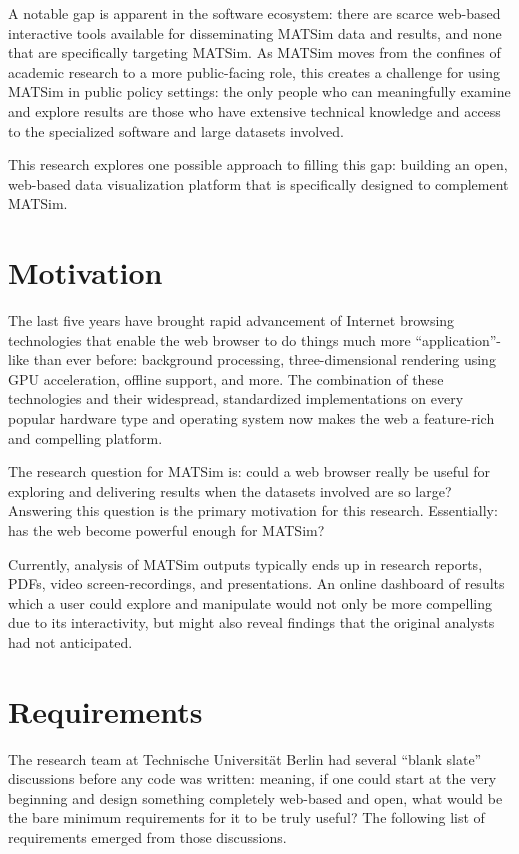 A notable gap is apparent in the software ecosystem: there are scarce web-based interactive tools available for disseminating MATSim data and results, and none that are specifically targeting MATSim. As MATSim moves from the confines of academic research to a more public-facing role, this creates a challenge for using MATSim in public policy settings: the only people who can meaningfully examine and explore results are those who have extensive technical knowledge and access to the specialized software and large datasets involved.

This research explores one possible approach to filling this gap: building an open, web-based data visualization platform that is specifically designed to complement MATSim.

\hypertarget{mathub-motivation}{%
\section{Motivation}\label{mathub-motivation}}

The last five years have brought rapid advancement of Internet browsing technologies that enable the web browser to do things much more ``application''-like than ever before: background processing, three-dimensional rendering using \gls{GPU} acceleration, offline support, and more. The combination of these technologies and their widespread, standardized implementations on every popular hardware type and operating system now makes the web a feature-rich and compelling platform.

The research question for MATSim is: could a web browser really be useful for exploring and delivering results when the datasets involved are so large? Answering this question is the primary motivation for this research. Essentially: has the web become powerful enough for MATSim?

Currently, analysis of MATSim outputs typically ends up in research reports, PDFs, video screen-recordings, and presentations. An online dashboard of results which a user could explore and manipulate would not only be more compelling due to its interactivity, but might also reveal findings that the original analysts had not anticipated.

\hypertarget{mathub-requirements}{%
\section{Requirements}\label{requirements}}

The research team at Technische Universität Berlin had several ``blank slate'' discussions before any code was written: meaning, if one could start at the very beginning and design something completely web-based and open, what would be the bare minimum requirements for it to be truly useful? The following list of requirements emerged from those discussions.

